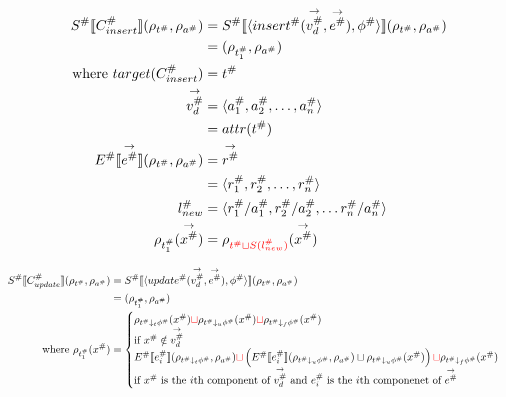 \begin{align*}
    S^\# \llbracket C_{insert}^\# \rrbracket (\rho_{t^\#}, \rho_{a^\#})
    &= S^\# \llbracket \langle insert^\#(\overset{\rightarrow}{v_d^\#}, \overset{\rightarrow}{e^\#}), \phi^\# \rangle \rrbracket (\rho_{t^\#}, \rho_{a^\#}) \\
    &= (\rho_{t_1^\#}, \rho_{a^\#}) \\
    \text{where } target(C_{insert}^\#) &= t^\# \\
    \overset{\rightarrow}{v_d^\#} &= \langle a_1^\#, a_2^\#, \dots, a_n^\# \rangle \\
    &= attr(t^\#) \\
    E^\# \llbracket \overset{\rightarrow}{e^\#} \rrbracket (\rho_{t^\#}, \rho_{a^\#})
    &= \overset{\rightarrow}{r^\#} \\
    &= \langle r_1^\#, r_2^\#, \dots, r_n^\# \rangle \\
    l_{new}^\# &= \langle r_1^\#/a_1^\#, r_2^\#/a_2^\#, \dots r_n^\#/a_n^\# \rangle \\
    \rho_{t_1^\#}(\overset{\rightarrow}{x^\#}) &= \rho_{\textcolor{red}{t^\# \sqcup S(l_{new}^\#)}}(\overset{\rightarrow}{x^\#})
\end{align*}



\begin{align*}
    S^\# \llbracket C^\#_{update} \rrbracket(\rho_{t^\#}, \rho_{a^\#})
    &= S^\# \llbracket \langle update^\#(\overset{\rightarrow}{v_d^\#}, \overset{\rightarrow}{e^\#}), \phi^\# \rangle \rrbracket (\rho_{t^\#}, \rho_{a^\#}) \\
    &= (\rho_{t^\#_1}, \rho_{a^\#}) \\
    \text{where } \rho_{t^\#_1}(x^\#) &=
    \begin{cases}
        \rho_{t^\# \downarrow_t \phi^\#}(x^\#) \textcolor{red}{\sqcup} \rho_{t^\# \downarrow_u \phi^\#}(x^\#) \textcolor{red}{\sqcup} \rho_{t^\# \downarrow_f \phi^\#}(x^\#) \\
        \text{if } x^\# \notin \overset{\rightarrow}{v_d^\#} \\
        E^\# \llbracket e^\#_{i} \rrbracket(\rho_{t^\# \downarrow_t \phi^\#}, \rho_{a^\#}) \textcolor{red}{\sqcup}
        \left( E^\# \llbracket e^\#_{i} \rrbracket(\rho_{t^\# \downarrow_u \phi^\#}, \rho_{a^\#}) \sqcup \rho_{t^\# \downarrow_u \phi^\#}(x^\#) \right) \textcolor{red}{\sqcup} \rho_{t^\# \downarrow_f \phi^\#}(x^\#) \\
        \text{if $x^\#$ is the $i$th component of $\overset{\rightarrow}{v_d^\#}$ and $e^\#_{i}$ is the $i$th componenet of $\overset{\rightarrow}{e^\#}$} \\
    \end{cases}
\end{align*}

